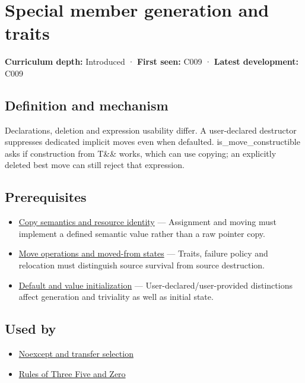 \hypertarget{appendix-42e02a12c694}{}\label{referencestart:appendix-42e02a12c694}
\section{Special member generation and traits}\label{appendix-42e02a12c694-special-member-generation-and-traits}

\textbf{Curriculum depth:} Introduced · \textbf{First seen:} C009 · \textbf{Latest development:} C009

\subsection{Definition and mechanism}\label{appendix-42e02a12c694-definition-and-mechanism}

Declarations, deletion and expression usability differ. A user-declared destructor suppresses dedicated implicit moves even when defaulted. is\_move\_constructible asks if construction from T\&\& works, which can use copying; an explicitly deleted best move can still reject that expression.

\subsection{Prerequisites}\label{appendix-42e02a12c694-prerequisites}

\begin{itemize}
\tightlist
\item
  \hyperref[appendix-1340cd1ce582]{Copy semantics and resource identity} --- Assignment and moving must implement a defined semantic value rather than a raw pointer copy.
\item
  \hyperref[appendix-5636651017c2]{Move operations and moved-from states} --- Traits, failure policy and relocation must distinguish source survival from source destruction.
\item
  \hyperref[appendix-ba8c1a9fe03f]{Default and value initialization} --- User-declared/user-provided distinctions affect generation and triviality as well as initial state.
\end{itemize}

\subsection{Used by}\label{appendix-42e02a12c694-used-by}

\begin{itemize}
\tightlist
\item
  \hyperref[appendix-c746afaa47d1]{Noexcept and transfer selection}
\item
  \hyperref[appendix-7679107d057e]{Rules of Three Five and Zero}
\end{itemize}

